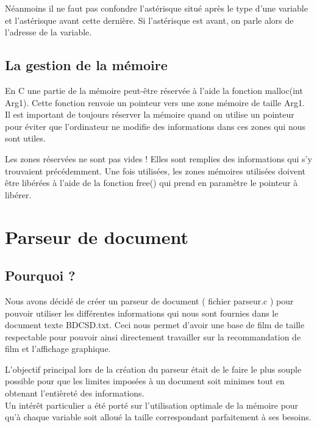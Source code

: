 \documentclass{article}
\begin{document}
    \par Néanmoins il ne faut pas confondre l'astérisque situé après le type d'une variable et l'astérisque avant cette dernière. Si l'astérisque est avant, on parle alors de l'adresse de la variable.
    
\subsection{La gestion de la mémoire}
    En C une partie de la mémoire peut-être réservée à l'aide la fonction malloc(int Arg1). Cette fonction renvoie un pointeur vers une zone mémoire de taille Arg1. Il est important de toujours réserver la mémoire quand on utilise un pointeur pour éviter que l'ordinateur ne modifie des informations dans ces zones qui nous sont utiles. 
    \par Les zones réservées ne sont pas vides ! Elles sont remplies des informations qui s'y trouvaient précédemment. Une fois utilisées, les zones mémoires utilisées doivent être libérées à l'aide de la fonction free() qui prend en paramètre le pointeur à libérer.  

\newpage


\section{Parseur de document}
\subsection{Pourquoi ?}

    Nous avons décidé de créer un parseur de document ( fichier parseur.c ) pour pouvoir utiliser les différentes informations qui nous sont fournies dans le document texte BDCSD.txt. Ceci nous permet d'avoir une base de film de taille respectable pour pouvoir ainsi directement travailler sur la recommandation de film et l'affichage graphique.\\
    \par L'objectif principal lors de la création du parseur était de le faire le plus souple possible pour que les limites imposées à un document soit minimes tout en obtenant l'entièreté des informations.\\
    Un intérêt particulier a été porté sur l'utilisation optimale de la mémoire pour qu'à chaque variable soit alloué la taille correspondant parfaitement à ses besoins.\\
\end{document}
